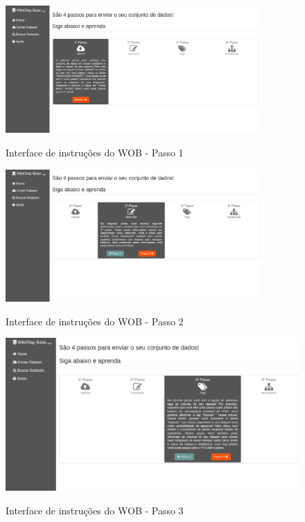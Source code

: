 \begin{figure}[!htb]
    \centering
    \caption{Interface de instruções do WOB - Passo 1}
    \includegraphics[width=0.87\textwidth]{./04-figuras/wob-ajuda}
    \label{fig:wob-ajuda}
\end{figure}

\begin{figure}[!htb]
    \centering
    \caption{Interface de instruções do WOB - Passo 2}
    \includegraphics[width=0.87\textwidth]{./04-figuras/wob-ajuda2}
    \label{fig:wob-ajuda2}
\end{figure}

\begin{figure}[!htb]
    \centering
    \caption{Interface de instruções do WOB - Passo 3}
    \includegraphics[width=1\textwidth]{./04-figuras/wob-ajuda3}
    \label{fig:wob-ajuda3}
\end{figure}

